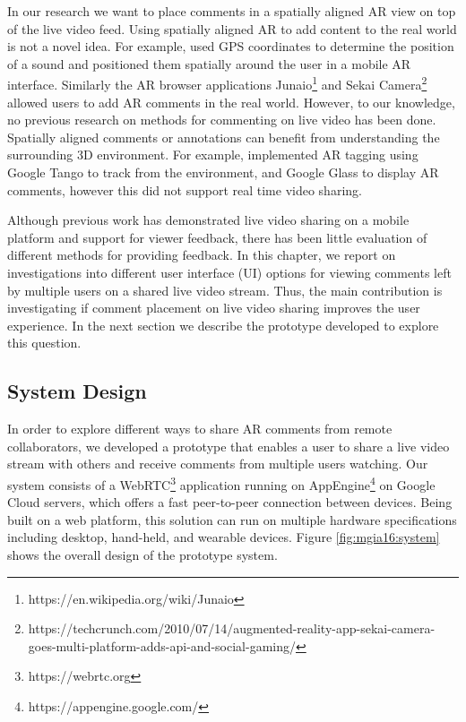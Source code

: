 

In our research we want to place comments in a spatially aligned AR view on top of the live video feed. Using spatially aligned AR to add content to the real world is not a novel idea. For example, \cite{Langlotz2013} used GPS coordinates to determine the position of a sound and positioned them spatially around the user in a mobile AR interface. Similarly the AR browser applications Junaio\footnote{https://en.wikipedia.org/wiki/Junaio} and Sekai Camera\footnote{https://techcrunch.com/2010/07/14/augmented-reality-app-sekai-camera-goes-multi-platform-adds-api-and-social-gaming/} allowed users to add AR comments in the real world. However, to our knowledge, no previous research on methods for commenting on live video has been done. Spatially aligned comments or annotations can benefit from understanding the surrounding 3D environment. For example, \cite{Nassani2015} implemented AR tagging using Google Tango to track from the environment, and Google Glass to display AR comments, however this did not support real time video sharing. 

Although previous work has demonstrated live video sharing on a mobile platform and support for viewer feedback, there has been little evaluation of different methods for providing feedback. In this chapter, we report on investigations into different user interface (UI) options for viewing comments left by multiple users on a shared live video stream. Thus, the main contribution is investigating if comment placement on live video sharing improves the user experience. In the next section we describe the prototype developed to explore this question.

\subsection{System Design}

In order to explore different ways to share AR comments from remote collaborators, we developed a prototype that enables a user to share a live video stream with others and receive comments from multiple users watching. Our system consists of a WebRTC\footnote{https://webrtc.org} application running on AppEngine\footnote{https://appengine.google.com/} on Google Cloud servers, which offers a fast peer-to-peer connection between devices. Being built on a web platform, this solution can run on multiple hardware specifications including desktop, hand-held, and wearable devices. Figure \ref{fig:mgia16:system} shows the overall design of the prototype system.


